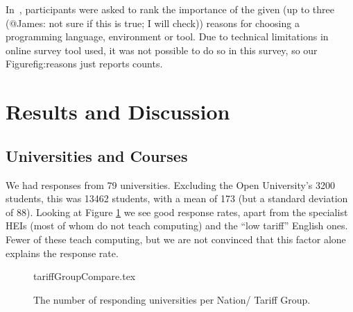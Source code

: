 \documentclass{sig-alternate}
\begin{document}
In~\cite{mason+cooper:2014}, participants were asked to rank the importance of the given (up to three (@James: not sure if this is true; I will check)) reasons for choosing a programming language, environment or tool. Due to technical limitations in online survey tool used, it was not possible to do so in this survey, so our Figure{fig:reasons} just reports counts.

\section{Results and Discussion}\label{results}

\subsection{Universities and Courses}
We had responses from 79 universities. Excluding the Open University's 3200 students, this was 13462 students, with a mean of 173 (but a standard deviation of 88). Looking at Figure \ref{fig:TG} we see good response rates, apart from the specialist HEIs (most of whom do not teach computing) and the ``low tariff'' English ones. Fewer of these teach computing, %
but we are not convinced that this factor alone explains the response rate.
\begin{figure}
\begin{center}
{tariffGroupCompare.tex}\vskip-12pt
\caption{The number of responding universities per Nation/   
 Tariff Group.\label{fig:TG}}
\end{center}
\end{figure}

\end{document}
